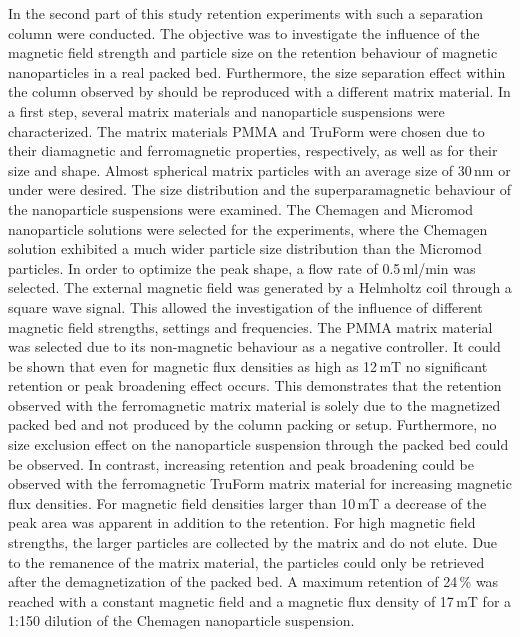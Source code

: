 In the second part of this study retention experiments with such a separation column were conducted. The objective was to investigate the influence of the magnetic field strength and particle size on the retention behaviour of magnetic nanoparticles in a real packed bed. Furthermore, the size separation effect within the column observed by \cite{AndreMaster} should be reproduced with a different matrix material. 
In a first step, several matrix materials and nanoparticle suspensions were characterized. The matrix materials PMMA and TruForm were chosen due to their diamagnetic and ferromagnetic properties, respectively, as well as for their size and shape. Almost spherical matrix particles with an average size of 30\,nm or under were desired. The size distribution and the superparamagnetic behaviour of the nanoparticle suspensions were examined. The Chemagen and Micromod nanoparticle solutions were selected for the experiments, where the Chemagen solution exhibited a much wider particle size distribution than the Micromod particles. In order to optimize the peak shape, a flow rate of 0.5\,ml/min was selected. The external magnetic field was generated by a Helmholtz coil through a square wave signal. This allowed the investigation of the influence of different magnetic field strengths, settings and frequencies. The PMMA matrix material was selected due to its non-magnetic behaviour as a negative controller. It could be shown that even for magnetic flux densities as high as 12\,mT no significant retention or peak broadening effect occurs. This demonstrates that the retention observed with the ferromagnetic matrix material is solely due to the magnetized packed bed and not produced by the column packing or setup. Furthermore, no size exclusion effect on the nanoparticle suspension through the packed bed could be observed. In contrast, increasing retention and peak broadening could be observed with the ferromagnetic TruForm matrix material for increasing magnetic flux densities. For magnetic field densities larger than 10\,mT a decrease of the peak area was apparent in addition to the retention. For high magnetic field strengths, the larger particles are collected by the matrix and do not elute. Due to the remanence of the matrix material, the particles could only be retrieved after the demagnetization of the packed bed. A maximum retention of 24\,\% was reached with a constant magnetic field and a magnetic flux density of 17\,mT for a 1:150 dilution of the Chemagen nanoparticle suspension.

